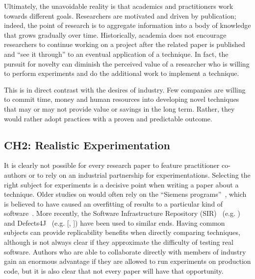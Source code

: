 Ultimately, the unavoidable reality is that academics and practitioners work towards different goals.
Researchers are motivated and driven by publication; indeed, the point of research is to aggregate information into a body of knowledge that grows gradually over time.
Historically, academia does not encourage researchers to continue working on a project after the related paper is published and ``see it through'' to an eventual application of a technique.
In fact, the pursuit for novelty can diminish the perceived value of a researcher who is willing to perform experiments and do the additional work to implement a technique.

This is in direct contrast with the desires of industry.
Few companies are willing to commit time, money and human resources into developing novel techniques that may or may not provide value or savings in the long term.
Rather, they would rather adopt practices with a proven and predictable outcome.


\subsection{CH2: Realistic Experimentation}
It is clearly not possible for every research paper to feature practitioner co-authors or to rely on an industrial partnership for experimentations.
Selecting the right subject for experiments is a decisive point when writing a paper about a technique.
Older studies on \rt would often rely on the ``Siemens programs''~\cite{hutchins1994experiments}, which is believed to have caused an overfitting of results to a particular kind of software~\cite{do_recent_2016}.
More recently, the Software Infrastructure Repository (SIR)~\cite{do2005supporting} (e.g. ) and Defects4J~\cite{just2014defects4j} (e.g. [, ]) have been used to similar ends.
Having common subjects can provide replicability benefits when directly comparing techniques, although is not always clear if they approximate the difficulty of testing real software.
Authors who are able to collaborate directly with members of industry gain an enormous advantage if they are allowed to run experiments on production code, but it is also clear that not every paper will have that opportunity.

